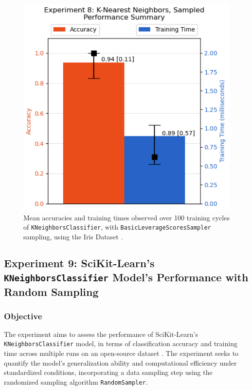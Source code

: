 \documentclass{article}
\theoremstyle{plain}
\theoremstyle{definition}
\theoremstyle{remark}
\begin{document}
\begin{figure}[ht]
	\vskip 0.2in
	\begin{center}
		\centerline{\includegraphics[width=\columnwidth]{experiment_08}}
		\caption{Mean accuracies and training times observed over 100 training cycles of \texttt{KNeighborsClassifier}, with \texttt{BasicLeverageScoresSampler} sampling, using the Iris Dataset \cite{iris}.}
		\label{experiment_08}
	\end{center}
	\vskip -0.2in
\end{figure}


\subsection{Experiment 9: SciKit-Learn's \texttt{KNeighborsClassifier} Model's Performance with Random Sampling}

\subsubsection{Objective}

The experiment aims to assess the performance of SciKit-Learn's \texttt{KNeighborsClassifier} model, in terms of classification accuracy and training time across multiple runs on an open-source dataset \cite{iris}. The experiment seeks to quantify the model's generalization ability and computational efficiency under standardized conditions, incorporating a data sampling step using the randomized sampling algorithm \texttt{RandomSampler}.
\end{document}
